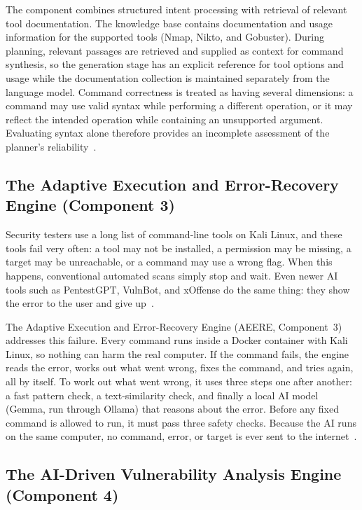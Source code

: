 The component combines structured intent processing with retrieval of relevant
tool documentation. The knowledge base contains documentation and usage
information for the supported tools (Nmap, Nikto, and Gobuster). During planning,
relevant passages are retrieved and supplied as context for command synthesis,
so the generation stage has an explicit reference for tool options and usage
while the documentation collection is maintained separately from the language
model. Command correctness is treated as having several dimensions: a command may
use valid syntax while performing a different operation, or it may reflect the
intended operation while containing an unsupported argument. Evaluating syntax
alone therefore provides an incomplete assessment of the planner's
reliability~\cite{lewis2020rag,reimers2019sentencebert}.

\subsection{The Adaptive Execution and Error-Recovery Engine (Component 3)}\label{sec:ctx-aeere}

Security testers use a long list of command-line tools on Kali Linux, and these
tools fail very often: a tool may not be installed, a permission may be missing,
a target may be unreachable, or a command may use a wrong flag. When this
happens, conventional automated scans simply stop and wait. Even newer AI tools
such as PentestGPT, VulnBot, and xOffense do the same thing: they show the error
to the user and give up~\cite{pentestgpt,deng2024pentestgpt,vulnbot2025,xoffense2025}.

The Adaptive Execution and Error-Recovery Engine (AEERE, Component~3) addresses
this failure. Every command runs inside a Docker container with Kali Linux, so
nothing can harm the real computer. If the command fails, the engine reads the
error, works out what went wrong, fixes the command, and tries again, all by
itself. To work out what went wrong, it uses three steps one after another: a
fast pattern check, a text-similarity check, and finally a local AI model (Gemma,
run through Ollama) that reasons about the error. Before any fixed command is
allowed to run, it must pass three safety checks. Because the AI runs on the
same computer, no command, error, or target is ever sent to the
internet~\cite{yao2023react,shinn2023reflexion,gou2024critic}.

\subsection{The AI-Driven Vulnerability Analysis Engine (Component 4)}\label{sec:ctx-avae}

